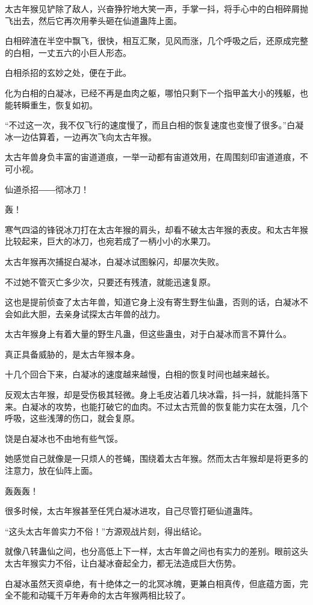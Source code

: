 \begin{this_body}
太古年猴见铲除了敌人，兴奋狰狞地大笑一声，手掌一抖，将手心中的白相碎屑抛飞出去，然后它再次用拳头砸在仙道蛊阵上面。

白相碎渣在半空中飘飞，很快，相互汇聚，见风而涨，几个呼吸之后，还原成完整的白相，一丈五六的小巨人形态。

白相杀招的玄妙之处，便在于此。

化为白相的白凝冰，已经不再是血肉之躯，哪怕只剩下一个指甲盖大小的残躯，也能转瞬重生，恢复如初。

“不过这一次，我不仅飞行的速度慢了，而且白相的恢复速度也变慢了很多。”白凝冰一边估算着，一边再次飞向太古年猴。

太古年兽身负丰富的宙道道痕，一举一动都有宙道效用，在周围刻印宙道道痕，不可小视。

仙道杀招――彻冰刀！

轰！

寒气四溢的锋锐冰刀打在太古年猴的肩头，却看不破太古年猴的表皮。和太古年猴比较起来，巨大的冰刀，也宛若成了一柄小小的水果刀。

太古年猴再次捕捉白凝冰，白凝冰试图躲闪，却屡次失败。

不过她不管灭亡多少次，只要还有残渣，就能迅速复原。

这也是提前侦查了太古年兽，知道它身上没有寄生野生仙蛊，否则的话，白凝冰不会如此大胆，去亲身试探太古年兽的战力。

太古年猴身上有着大量的野生凡蛊，但这些蛊虫，对于白凝冰而言不算什么。

真正具备威胁的，是太古年猴本身。

十几个回合下来，白凝冰的速度越来越慢，白相的恢复时间也越来越长。

反观太古年猴，却是受伤极其轻微。身上毛皮沾着几块冰霜，抖一抖，就能抖落下来。白凝冰的攻势，也能打破它的血肉。不过太古荒兽的恢复能力实在太强，几个呼吸，这些浅薄的伤口，就会复原。

饶是白凝冰也不由地有些气馁。

她感觉自己就像是一只烦人的苍蝇，围绕着太古年猴。然而太古年猴却是将更多的注意力，放在仙阵上面。

轰轰轰！

很多时候，太古年猴甚至任凭白凝冰进攻，自己尽管打砸仙道蛊阵。

“这头太古年兽实力不俗！”方源观战片刻，得出结论。

就像八转蛊仙之间，也分高低上下一样，太古年兽之间也有实力的差别。眼前这头太古年猴实力不俗，让白凝冰奋起全力，都无法造成巨大伤势。

白凝冰虽然天资卓绝，有十绝体之一的北冥冰魄，更兼白相真传，但底蕴方面，完全不能和动辄千万年寿命的太古年猴两相比较了。


\end{this_body}
